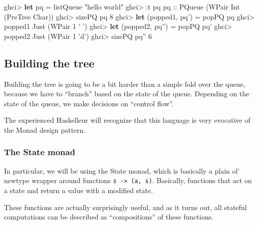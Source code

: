 \documentclass[]{article}
\newenvironment{Shaded}{}{}
\newcommand{\KeywordTok}[1]{\textcolor[rgb]{0.00,0.44,0.13}{\textbf{{#1}}}}
\newcommand{\DataTypeTok}[1]{\textcolor[rgb]{0.56,0.13,0.00}{{#1}}}
\newcommand{\DecValTok}[1]{\textcolor[rgb]{0.25,0.63,0.44}{{#1}}}
\newcommand{\CharTok}[1]{\textcolor[rgb]{0.25,0.44,0.63}{{#1}}}
\newcommand{\StringTok}[1]{\textcolor[rgb]{0.25,0.44,0.63}{{#1}}}
\newcommand{\OtherTok}[1]{\textcolor[rgb]{0.00,0.44,0.13}{{#1}}}
\newcommand{\FunctionTok}[1]{\textcolor[rgb]{0.02,0.16,0.49}{{#1}}}
\newcommand{\NormalTok}[1]{{#1}}
\begin{document}
\begin{Shaded}
\begin{Highlighting}[]
\NormalTok{ghci}\FunctionTok{>} \KeywordTok{let} \NormalTok{pq }\FunctionTok{=} \NormalTok{listQueue }\StringTok{"hello world"}
\NormalTok{ghci}\FunctionTok{>} \FunctionTok{:}\NormalTok{t pq}
\OtherTok{pq ::} \DataTypeTok{PQueue} \NormalTok{(}\DataTypeTok{WPair} \DataTypeTok{Int} \NormalTok{(}\DataTypeTok{PreTree} \DataTypeTok{Char}\NormalTok{))}
\NormalTok{ghci}\FunctionTok{>} \NormalTok{sizePQ pq}
\DecValTok{8}
\NormalTok{ghci}\FunctionTok{>} \KeywordTok{let} \NormalTok{(popped1, pq') }\FunctionTok{=} \NormalTok{popPQ pq}
\NormalTok{ghci}\FunctionTok{>} \NormalTok{popped1}
\DataTypeTok{Just} \NormalTok{(}\DataTypeTok{WPair} \DecValTok{1} \CharTok{' '}\NormalTok{)}
\NormalTok{ghci}\FunctionTok{>} \KeywordTok{let} \NormalTok{(popped2, pq'') }\FunctionTok{=} \NormalTok{popPQ pq'}
\NormalTok{ghci}\FunctionTok{>} \NormalTok{popped2}
\DataTypeTok{Just} \NormalTok{(}\DataTypeTok{WPair} \DecValTok{1} \CharTok{'d'}\NormalTok{)}
\NormalTok{ghci}\FunctionTok{>} \NormalTok{sizePQ pq''}
\DecValTok{6}
\end{Highlighting}
\end{Shaded}

\subsection{Building the tree}\label{building-the-tree}

Building the tree is going to be a bit harder than a simple fold over the queue,
because we have to ``branch'' based on the state of the queue. Depending on the
state of the queue, we make decisions on ``control flow''.

The experienced Haskelleur will recognize that this language is very evocative
of the Monad design pattern.

\subsubsection{The State monad}\label{the-state-monad}

In particular, we will be using the State monad, which is basically a plain ol'
newtype wrapper around functions \texttt{s\ -\textgreater{}\ (a,\ s)}.
Basically, functions that act on a state and return a value with a modified
state.

These functions are actually surprisingly useful, and as it turns out, all
stateful computations can be described as ``compositions'' of these functions.
\end{document}
